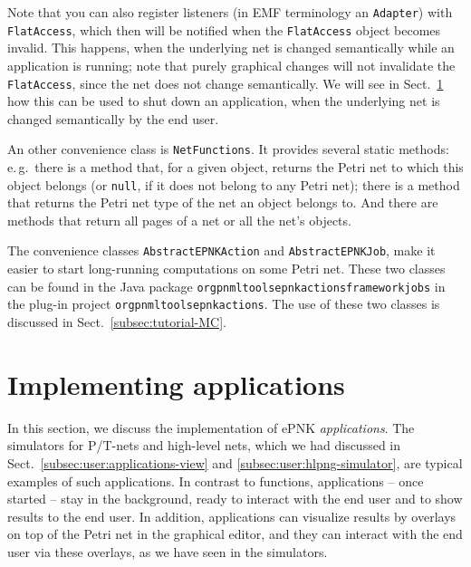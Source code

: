 Note that you can also register listeners (in EMF terminology an {\tt Adapter})
with {\tt FlatAccess}, which then will be notified when the {\tt FlatAccess}
object becomes invalid. This happens, when the underlying net is changed semantically
while an application is running; note that purely graphical changes will not
invalidate the  {\tt FlatAccess}, since the net does not change semantically. 
We will see in Sect.~\ref{subsec:developer:applications} how this can be used
to shut down an application, when the underlying net is changed semantically
by the end user.

An other convenience class is {\tt NetFunctions}.%
It provides several static methods: e.\,g.\ there is a method that, for a
given object, returns the Petri net to which this object belongs (or {\tt null},
if it does not belong to any Petri  net); there is a method that returns the Petri net
type of the net an object belongs to. And there are methods that return
all pages of a net or all the net's objects. 

The convenience classes {\tt AbstractEPNKAction}%
and {\tt AbstractEPNKJob},%
make it easier to start long-running computations on some Petri net. These
two classes can be found in the Java package
{\tt org\qnsep{}pnml\qnsep{}tools\qnsep{}epnk\qnsep{}actions\qnsep{}framework\qnsep{}jobs}
in the plug-in project
{\tt org\qnsep{}pnml\qnsep{}tools\qnsep{}epnk\qnsep{}actions}.
The use of these two classes is discussed in Sect.~\ref{subsec:tutorial-MC}.%

\section{Implementing applications}
\label{subsec:developer:applications}

In this section, we discuss the implementation of ePNK \emph{applications}.
The simulators for P/T-nets and high-level nets, which we had discussed
in Sect.~\ref{subsec:user:applications-view} and \ref{subsec:user:hlpng-simulator},
are typical examples of such applications.
In contrast to functions, applications -- once started -- stay in the background,
ready to interact with the end user and to show results to the end user.
In addition, applications can visualize results by overlays
on top of the Petri net in the graphical editor, and they can interact with the end user
via these overlays, as we have seen in the simulators.

